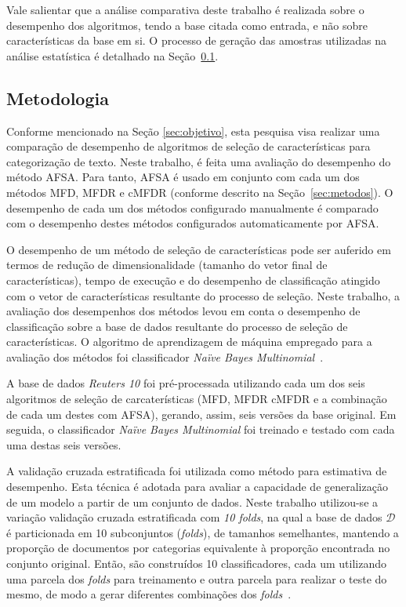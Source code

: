 \documentclass[conference]{IEEEtran}
\begin{document}
Vale salientar que  a análise comparativa deste trabalho é realizada sobre o desempenho dos algoritmos, tendo a base citada como entrada, e não sobre características da base em si. O processo de geração das amostras utilizadas na análise estatística é detalhado na Seção~\ref{sec:metodologia}.

\subsection{Metodologia}
\label{sec:metodologia}

Conforme mencionado na Seção \ref{sec:objetivo}, esta pesquisa visa realizar uma comparação de desempenho de algoritmos de seleção de características para categorização de texto.
Neste trabalho, é feita uma avaliação do desempenho do método AFSA. Para tanto, AFSA é usado em conjunto com cada um dos métodos MFD, MFDR e cMFDR (conforme descrito na Seção~\ref{sec:metodos}). O desempenho de cada um dos métodos configurado manualmente é comparado com o desempenho destes métodos configurados automaticamente por AFSA.

O desempenho de um método de seleção de características pode ser auferido em termos de redução de dimensionalidade (tamanho do vetor final de características), tempo de execução e do desempenho de classificação atingido com o vetor de características resultante do processo de seleção. Neste trabalho, a avaliação dos desempenhos dos métodos levou em conta o desempenho de classificação sobre a base de dados resultante do processo de seleção de características. O algoritmo de aprendizagem de máquina empregado para a avaliação dos métodos foi classificador \textit{Na\"ive Bayes Multinomial}~\cite{mccallum1998comparison}. 

A base de dados \textit{Reuters 10} foi pré-processada utilizando cada um dos seis algoritmos de seleção de carcaterísticas (MFD, MFDR cMFDR e a combinação de cada um destes com AFSA), gerando, assim, seis versões da base original. Em seguida, o classificador \textit{Na\"ive Bayes Multinomial} foi treinado e testado com cada uma destas seis versões.

A validação cruzada estratificada foi utilizada como método para estimativa de desempenho.
Esta técnica é adotada para avaliar a capacidade de generalização de um modelo a partir de um conjunto de dados.
Neste trabalho utilizou-se a variação validação cruzada estratificada com \emph{10 folds}, na qual a base de dados $\mathcal{D}$ é particionada em 10 subconjuntos (\emph{folds}), de tamanhos semelhantes, mantendo a proporção de documentos por categorias equivalente à proporção encontrada no conjunto original. Então, são construídos 10 classificadores, cada um utilizando uma parcela dos \emph{folds} para treinamento e outra parcela para realizar o teste do mesmo, de modo a gerar diferentes combinações dos \emph{folds}~\cite{kohavi1995study}.
\end{document}
